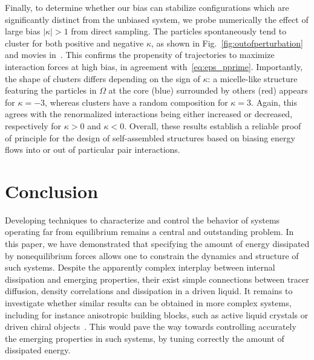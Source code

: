 \documentclass[pre, superscriptaddress, twocolumn,pre]{revtex4-1}
\begin{document}
Finally, to determine whether our bias can stabilize configurations which are significantly distinct from the unbiased system, we probe numerically the effect of large bias $|\kappa|>1$ from direct sampling. The particles spontaneously tend to cluster for both positive and negative $\kappa$, as shown in Fig.~\ref{fig:outofperturbation} and movies in~\cite{movie}. This confirms the propensity of trajectories to maximize interaction forces at high bias, in agreement with~\eqref{eq:eps_pprime}. Importantly, the shape of clusters differs depending on the sign of $\kappa$: a micelle-like structure featuring the particles in $\Omega$ at the core (blue) surrounded by others (red) appears for $\kappa=-3$, whereas clusters have a random composition for $\kappa=3$. Again, this agrees with the renormalized interactions being either increased or decreased, respectively for $\kappa>0$ and $\kappa<0$. Overall, these results establish a reliable proof of principle for the design of self-assembled structures based on biasing energy flows into or out of particular pair interactions.




\section{Conclusion}

Developing techniques to characterize and control the behavior of systems operating far from equilibrium remains a central and outstanding problem. In this paper, we have demonstrated that specifying the amount of energy dissipated by nonequilibrium forces allows one to constrain the dynamics and structure of such systems. Despite the apparently complex interplay between internal dissipation and emerging properties, their exist simple connections between tracer diffusion, density correlations and dissipation in a driven liquid. It remains to investigate whether similar results can be obtained in more complex systems, including for instance anisotropic building blocks, such as active liquid crystals or driven chiral objects~\cite{Joshi2017, VanZuiden2016, Nguyen2014b}. This would pave the way towards controlling accurately the emerging properties in such systems, by tuning correctly the amount of dissipated energy.
\end{document}
